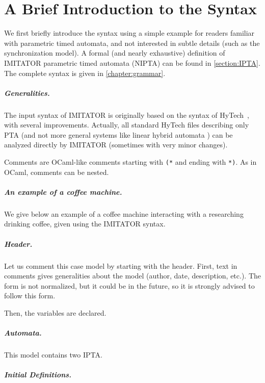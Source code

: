 \documentclass[a4paper,11pt]{report}
\newcommand{\hytech}{{\sc HyTech}}
\newcommand{\imitator}{\textsf{IMITATOR}}
\newcommand{\IPTA}{IPTA}
\newcommand{\NIPTA}{NIPTA}
\newcommand{\paragraphe}[1]{\paragraph{#1.}}
\newcommand{\styleIMI}[1]{\textcolor{imicolor}{\texttt{#1}}}
\newcommand{\IncludeIMIfile}[1]{
	\lstset{language=Imitator}
	
}
\begin{document}
\chapter{A Brief Introduction to the Syntax}

We first briefly introduce the syntax using a simple example for readers familiar with parametric timed automata, and not interested in subtle details (such as the synchronization model).
A formal (and nearly exhaustive) definition of \imitator{} parametric timed automata (\NIPTA{}) can be found in \cref{section:IPTA}.
The complete syntax is given in \cref{chapter:grammar}.

\paragraphe{Generalities}
The input syntax of \imitator{} is originally based on the syntax of \hytech{}~\cite{HHW95}, with several improvements.
Actually, all standard \hytech{} files describing only PTA (and not more general systems like linear hybrid automata \cite{achh92}) can be analyzed directly by \imitator{} (sometimes with very minor changes).

Comments are OCaml-like comments starting with \styleIMI{(*} and ending with \styleIMI{*)}.
As in OCaml, comments can be nested.


\paragraphe{An example of a coffee machine}
We give below an example of a coffee machine interacting with a researching drinking coffee, given using the \imitator{} syntax.

\IncludeIMIfile{../examples/Coffee/coffeeDrinker.imi}



\paragraphe{Header}
Let us comment this case model by starting with the header.
First, text in comments gives generalities about the model (author, date, description, etc.).
The form is not normalized, but it could be in the future, so it is strongly advised to follow this form.

Then, the variables are declared.


\paragraphe{Automata}
This model contains two \IPTA{}.

\paragraphe{Initial Definitions}







\end{document}
